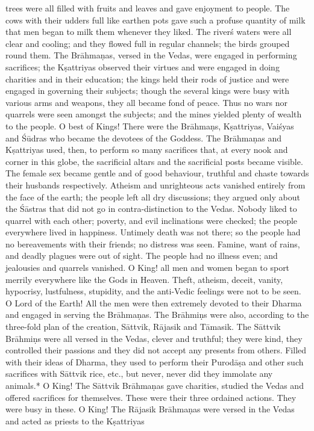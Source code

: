 trees were all filled with fruits and leaves and gave enjoyment to people. The cows with their udders full like earthen pots gave such a profuse quantity of milk that men began to milk them whenever they liked. The river\'s waters were all clear and cooling; and they flowed full in regular channels; the birds grouped round them. The Br\=ahma\d{n}as, versed in the Vedas, were engaged in performing sacrifices; the K\d{s}attriyas observed their virtues and were engaged in doing charities and in their education; the kings held their rods of justice and were engaged in governing their subjects; though the several kings were busy with various arms and weapons, they all became fond of peace. Thus no wars nor quarrels were seen amongst the subjects; and the mines yielded plenty of wealth to the people. O best of Kings! There were the Br\=ahma\d{n}s, K\d{s}attriyas, Vai\'syas and \'S\=udras who became the devotees of the Goddess. The Br\=ahma\d{n}as and K\d{s}attriyas used, then, to perform so many sacrifices that, at every nook and corner in this globe, the sacrificial altars and the sacrificial posts became visible. The female sex became gentle and of good behaviour, truthful and chaste towards their husbands respectively. Atheism and unrighteous acts vanished entirely from the face of the earth; the people left all dry discussions; they argued only about the \'S\=astras that did not go in contra-distinction to the Vedas. Nobody liked to quarrel with each other; poverty, and evil inclinations were checked; the people everywhere lived in happiness. Untimely death was not there; so the people had no bereavements with their friends; no distress was seen. Famine, want of rains, and deadly plagues were out of sight. The people had no illness even; and jealousies and quarrels vanished. O King! all men and women began to sport merrily everywhere like the Gods in Heaven. Theft, atheism, deceit, vanity, hypocrisy, lustfulness, stupidity, and the anti-Vedic feelings were not to be seen. O Lord of the Earth! All the men were then extremely devoted to their Dharma and engaged in serving the Br\=ahma\d{n}as. The Br\=ahmi\d{n}s were also, according to the three-fold plan of the creation, S\=attvik, R\=ajasik and T\=amasik. The S\=attvik Br\=ahmi\d{n}s were all versed in the Vedas, clever and truthful; they were kind, they controlled their passions and they did not accept any presents from others. Filled with their ideas of Dharma, they used to perform their Purod\=a\d{s}a and other such sacrifices with S\=attvik rice, etc., but never, never did they immolate any animals.* O King! The S\=attvik Br\=ahma\d{n}as gave charities, studied the Vedas and offered sacrifices for themselves. These were their three ordained actions. They were busy in these. O King! The R\=ajasik Br\=ahma\d{n}as were versed in the Vedas and acted as priests to the K\d{s}attriyas

